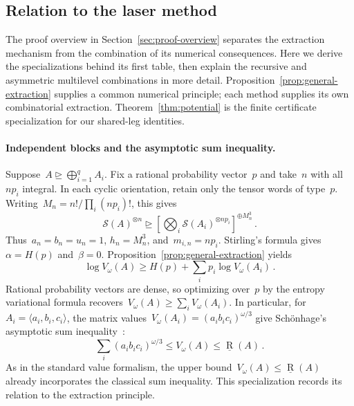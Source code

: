 \documentclass[11pt,letterpaper]{article}
\theoremstyle{definition}
\numberwithin{equation}{section}
\newcommand{\br}{\underline{\operatorname{R}}}
\newcommand{\degen}{\unrhd}
\begin{document}
\subsection{Relation to the laser method}\label{sec:laser-comparison}

The proof overview in Section~\ref{sec:proof-overview} separates the extraction mechanism from the combination of its numerical consequences. Here we derive the specializations behind its first table, then explain the recursive and asymmetric multilevel combinations in more detail. Proposition~\ref{prop:general-extraction} supplies a common numerical principle; each method supplies its own combinatorial extraction. Theorem~\ref{thm:potential} is the finite certificate specialization for our shared-leg identities.

\paragraph{Independent blocks and the asymptotic sum inequality.}
Suppose~$A\degen\bigoplus_{i=1}^q A_i$. Fix a rational probability vector~$p$ and take~$n$ with all~$np_i$ integral. In each cyclic orientation, retain only the tensor words of type~$p$. Writing~$M_n=n!/\prod_i(np_i)!$, this gives
\begin{equation*}
 \mathcal S(A)^{\otimes n}\degen
 \left[\bigotimes_i\mathcal S(A_i)^{\otimes np_i}\right]^{\oplus M_n^3}\,.
\end{equation*}
Thus~$a_n=b_n=u_n=1$, $h_n=M_n^3$, and~$m_{i,n}=np_i$. Stirling's formula gives~$\alpha=H(p)$ and~$\beta=0$. Proposition~\ref{prop:general-extraction} yields
\begin{equation*}
 \log V_\omega(A)\geq H(p)+\sum_i p_i\log V_\omega(A_i)\,.
\end{equation*}
Rational probability vectors are dense, so optimizing over~$p$ by the entropy variational formula recovers~$V_\omega(A)\geq\sum_iV_\omega(A_i)$. In particular, for~$A_i=\langle a_i,b_i,c_i\rangle$, the matrix values~$V_\omega(A_i)=(a_ib_ic_i)^{\omega/3}$ give Sch\"onhage's asymptotic sum inequality~\cite{Sch81}:
\begin{equation}\label{eq:asi-special-case}
 \sum_i(a_ib_ic_i)^{\omega/3}\leq V_\omega(A)\leq\br(A)\,.
\end{equation}
As in the standard value formalism, the upper bound~$V_\omega(A)\leq\br(A)$ already incorporates the classical sum inequality. This specialization records its relation to the extraction principle. 
\end{document}
